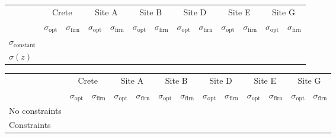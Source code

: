 \documentclass[../../CompleteThesis2/Complete_2ndDraft]{subfiles}
\begin{document}
\begin{table}[ht]
	\centering
	\begin{tabular}{l||*{6}{c | c||}}
		&
		\multicolumn{2}{c}{Crete} & \multicolumn{2}{c}{Site A} & \multicolumn{2}{c}{Site B} & \multicolumn{2}{c}{Site D} & \multicolumn{2}{c}{Site E} & \multicolumn{2}{c||}{Site G} \\
		&
		$\sigma_{\text{opt}}$ & $\sigma_{\text{firn}}$ & $\sigma_{\text{opt}}$ & $\sigma_{\text{firn}}$ & $\sigma_{\text{opt}}$ & $\sigma_{\text{firn}}$ & $\sigma_{\text{opt}}$ & $\sigma_{\text{firn}}$ & $\sigma_{\text{opt}}$ & $\sigma_{\text{firn}}$ & $\sigma_{\text{opt}}$ & $\sigma_{\text{firn}}$ \\
		
		\hline
		$\sigma_{\text{constant}}$ & & & & & & & & & & & & \\ 
		$\sigma(z)$ & & & & & & & & & & & & \\ 
	\end{tabular}
\end{table}


\begin{table}[ht]
	\centering
	\begin{tabular}{l||*{6}{c | c||}}
		&
		\multicolumn{2}{c}{Crete} & \multicolumn{2}{c}{Site A} & \multicolumn{2}{c}{Site B} & \multicolumn{2}{c}{Site D} & \multicolumn{2}{c}{Site E} & \multicolumn{2}{c||}{Site G} \\
		&
		$\sigma_{\text{opt}}$ & $\sigma_{\text{firn}}$ & $\sigma_{\text{opt}}$ & $\sigma_{\text{firn}}$ & $\sigma_{\text{opt}}$ & $\sigma_{\text{firn}}$ & $\sigma_{\text{opt}}$ & $\sigma_{\text{firn}}$ & $\sigma_{\text{opt}}$ & $\sigma_{\text{firn}}$ & $\sigma_{\text{opt}}$ & $\sigma_{\text{firn}}$ \\
		
		\hline
		No constraints & & & & & & & & & & & & \\ 
		Constraints & & & & & & & & & & & & \\ 
	\end{tabular}
\end{table}
\end{document}
